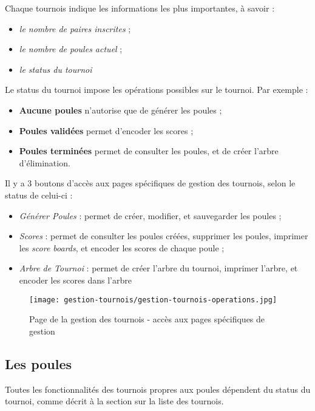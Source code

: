 Chaque tournois indique les informations les plus importantes, à savoir :

\begin{itemize}
\item \textit{le nombre de paires inscrites} ;
\item \textit{le nombre de poules actuel} ;
\item \textit{le status du tournoi}
\end{itemize}
\bigskip

Le status du tournoi impose les opérations possibles sur le tournoi. Par exemple :

\begin{itemize}
\item  \textbf{Aucune poules} n'autorise que de générer les poules ;
\item \textbf{Poules validées} permet d'encoder les scores ;
\item \textbf{Poules terminées} permet de consulter les poules, et de créer l'arbre d'élimination.
\end{itemize}
\bigskip

Il y a 3 boutons d'accès aux pages spécifiques de gestion des tournois, selon le status de celui-ci :

\begin{itemize}
\item \textit{Générer Poules} : permet de créer, modifier, et sauvegarder les poules ;
\item \textit{Scores} : permet de consulter les poules créées, supprimer les poules, imprimer les \textit{score boards}, et encoder les scores de chaque poule ;
\item \textit{Arbre de Tournoi} : permet de créer l'arbre du tournoi, imprimer l'arbre, et encoder les scores dans l'arbre
\end{itemize}

\begin{figure}[H]
\centering
\texttt{[image: gestion-tournois/gestion-tournois-operations.jpg]}
\caption{Page de la gestion des tournois - accès aux pages spécifiques de gestion}
\end{figure}

\subsection{Les poules}

Toutes les fonctionnalités des tournois propres aux poules dépendent du status du tournoi, comme décrit à la section sur la liste des tournois.\newline

